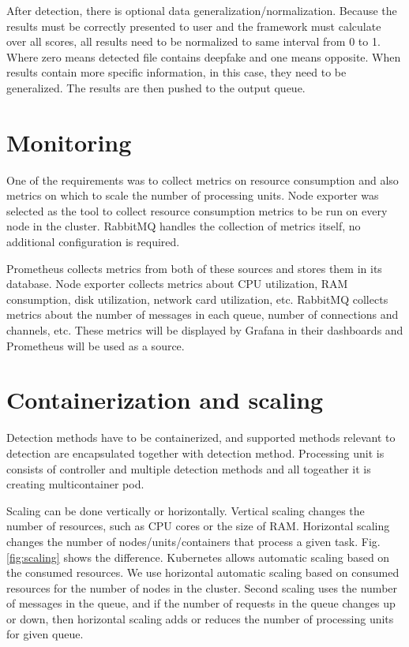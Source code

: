 After detection, there is optional data generalization/normalization. Because the results must be correctly presented to user and the framework must calculate over all scores, all results need to be normalized to same interval from 0 to 1. Where zero means detected file contains deepfake and one means opposite. When results contain more specific information, in this case, they need to be generalized. The results are then pushed to the output queue.

\section{Monitoring}

One of the requirements was to collect metrics on resource consumption and also metrics on which to scale the number of processing units. Node exporter was selected as the tool to collect resource consumption metrics to be run on every node in the cluster. RabbitMQ handles the collection of metrics itself, no additional configuration is required.

Prometheus collects metrics from both of these sources and stores them in its database. Node exporter collects metrics about CPU utilization, RAM consumption, disk utilization, network card utilization, etc. RabbitMQ collects metrics about the number of messages in each queue, number of connections and channels, etc. These metrics will be displayed by Grafana in their dashboards and Prometheus will be used as a source.

\section{Containerization and scaling}

Detection methods have to be containerized, and supported methods relevant to detection are encapsulated together with detection method. Processing unit is consists of controller and multiple detection methods and all togeather it is creating multicontainer pod.

Scaling can be done vertically or horizontally. Vertical scaling changes the number of resources, such as CPU cores or the size of RAM. Horizontal scaling changes the number of nodes/units/containers that process a given task. Fig. \ref{fig:scaling} shows the difference. Kubernetes allows automatic scaling based on the consumed resources. We use horizontal automatic scaling based on consumed resources for the number of nodes in the cluster. Second scaling uses the number of messages in the queue, and if the number of requests in the queue changes up or down, then horizontal scaling adds or reduces the number of processing units for given queue. 

